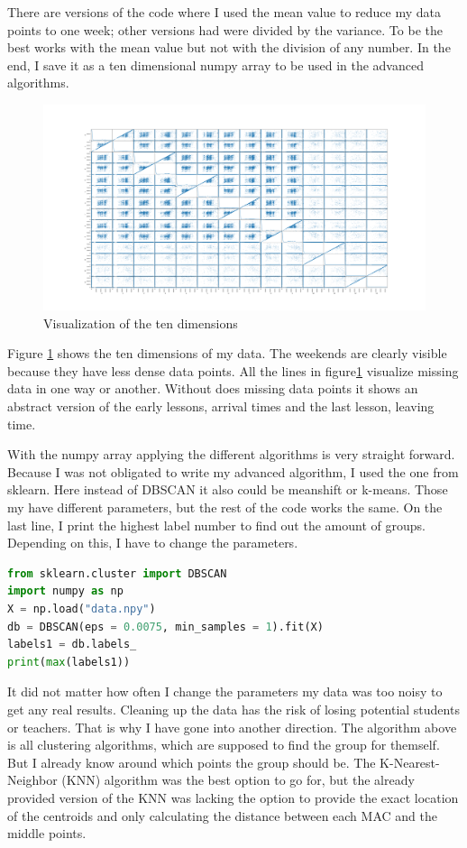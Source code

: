 \documentclass[11pt]{article}
\begin{document}
There are versions of the code where I used the mean value to reduce my data points to one week; other versions had were divided by the variance. To be the best works with the mean value but not with the division of any number.
In the end, I save it as a ten dimensional numpy array to be used in the advanced algorithms.

\begin{figure}
\centering
\includegraphics [width = \textwidth]{images/scattered_matrix_mean.png}
\caption{Visualization of the ten dimensions\label{fig:matrix}}
\end{figure}

Figure \ref{fig:matrix} shows the ten dimensions of my data. The weekends are clearly visible because they have less dense data points. All the lines in figure\ref{fig:matrix} visualize missing data in one way or another. Without does missing data points it shows an abstract version of the early lessons, arrival times and the last lesson, leaving time.

With the numpy array applying the different algorithms is very straight forward. Because I was not obligated to write my advanced algorithm, I used the one from sklearn. Here instead of DBSCAN it also could be meanshift or k-means. Those my have different parameters, but the rest of the code works the same. On the last line, I print the highest label number to find out the amount of groups. Depending on this, I have to change the parameters.
\begin{lstlisting}[language=Python,caption="advanced algorithm",style=python]
from sklearn.cluster import DBSCAN 
import numpy as np
X = np.load("data.npy")
db = DBSCAN(eps = 0.0075, min_samples = 1).fit(X) 
labels1 = db.labels_ 
print(max(labels1))
\end{lstlisting}

It did not matter how often I change the parameters my data was too noisy to get any real results. Cleaning up the data has the risk of losing potential students or teachers. That is why I have gone into another direction. The algorithm above is all clustering algorithms, which are supposed to find the group for themself. But I already know around which points the group should be. The K-Nearest-Neighbor (KNN) algorithm was the best option to go for, but the already provided version of the KNN was lacking the option to provide the exact location of the centroids and only calculating the distance between each MAC and the middle points.
\end{document}

